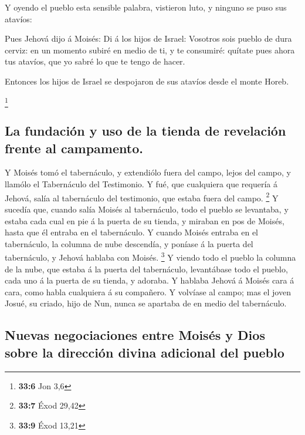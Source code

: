  Y oyendo el pueblo esta sensible palabra, vistieron luto,
y ninguno se puso sus atavíos:

 Pues Jehová dijo á Moisés: Di á los hijos de Israel:
Vosotros sois pueblo de dura cerviz: en un momento subiré en medio de
ti, y te consumiré: quítate pues ahora tus atavíos, que yo sabré lo que
te tengo de hacer.

 Entonces los hijos de Israel se despojaron de sus atavíos
desde el monte Horeb.

\footnote{\textbf{33:6} Jon 3,6}

\hypertarget{la-fundaciuxf3n-y-uso-de-la-tienda-de-revelaciuxf3n-frente-al-campamento.}{%
\subsection{La fundación y uso de la tienda de revelación frente al
campamento.}\label{la-fundaciuxf3n-y-uso-de-la-tienda-de-revelaciuxf3n-frente-al-campamento.}}

 Y Moisés tomó el tabernáculo, y extendiólo fuera del
campo, lejos del campo, y llamólo el Tabernáculo del Testimonio. Y fué,
que cualquiera que requería á Jehová, salía al tabernáculo del
testimonio, que estaba fuera del campo. \footnote{\textbf{33:7} Éxod
  29,42}  Y sucedía que, cuando salía Moisés al
tabernáculo, todo el pueblo se levantaba, y estaba cada cual en pie á la
puerta de su tienda, y miraban en pos de Moisés, hasta que él entraba en
el tabernáculo.  Y cuando Moisés entraba en el
tabernáculo, la columna de nube descendía, y poníase á la puerta del
tabernáculo, y Jehová hablaba con Moisés. \footnote{\textbf{33:9} Éxod
  13,21}  Y viendo todo el pueblo la columna de la nube,
que estaba á la puerta del tabernáculo, levantábase todo el pueblo, cada
uno á la puerta de su tienda, y adoraba.  Y hablaba
Jehová á Moisés cara á cara, como habla cualquiera á su compañero. Y
volvíase al campo; mas el joven Josué, su criado, hijo de Nun, nunca se
apartaba de en medio del tabernáculo.

\hypertarget{nuevas-negociaciones-entre-moisuxe9s-y-dios-sobre-la-direcciuxf3n-divina-adicional-del-pueblo}{%
\subsection{Nuevas negociaciones entre Moisés y Dios sobre la dirección
divina adicional del
pueblo}\label{nuevas-negociaciones-entre-moisuxe9s-y-dios-sobre-la-direcciuxf3n-divina-adicional-del-pueblo}}

